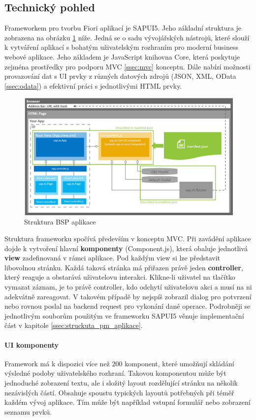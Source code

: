 \documentclass[thesis=M,czech]{FITthesis}[2012/06/26]
\begin{document}
\subsection{Technický pohled}
Frameworkem pro tvorbu Fiori aplikací je SAPUI5. Jeho základní struktura je zobrazena na obrázku \ref{img:fiori_arch} níže. Jedná se o sadu vývojářských nástrojů, které slouží k vytváření aplikací s bohatým uživatelským rozhraním pro moderní business webové aplikace. Jeho základem je JavaScript knihovna Core, která poskytuje zejména prostředky pro podporu MVC \ref{ssec:mvc} konceptu. Dále nabízí možnosti provazování dat s UI prvky z různých datových zdrojů (JSON, XML, OData \ref{ssec:odata}) a efektivní práci s jednotlivými HTML prvky. 
\begin{figure}[H]
	\centering
	\includegraphics[width=1\textwidth]{images/fiori_arch.png}
	\caption{Struktura BSP aplikace \cite{fiori_structure}}
	\label{img:fiori_arch}
\end{figure}
Struktura frameworku spočívá především v konceptu MVC. Při zavádění aplikace dojde k vytvoření hlavní \textbf{komponenty} (Component.js), která obaluje jednotlivá \textbf{view} zadefinovaná v rámci aplikace. Pod každým view si lze představit libovolnou stránku. Každá taková stránka má přiřazen právě jeden \textbf{controller}, který reaguje a obstarává uživatelovu interakci. Klikne-li uživatel na tlačítko vymazat záznam, je to právě controller, kdo odchytí uživatelovu akci a musí na ni adekvátně zareagovat. V takovém případě by nejspíš zobrazil dialog pro potvrzení nebo rovnou poslal na backend request pro vykonání dané operace. Podrobněji se jednotlivým souborům použitým ve frameworku SAPUI5 věnuje implementační část v kapitole \ref{ssec:struckuta_pm_aplikace}.

\paragraph{UI komponenty}
Framework má k dispozici více než 200 komponent, které umožňují skládání výsledné podoby uživatelského rozhraní. Takovou komponentou může být jednoduché zobrazení textu, ale i složitý layout rozdělující stránku na několik nezávislých částí. Obsahuje spoustu typických layoutů potřebných při téměř každém vývoj aplikace. Tím může být například vstupní formulář nebo zobrazení seznamu prvků. 
\end{document}
